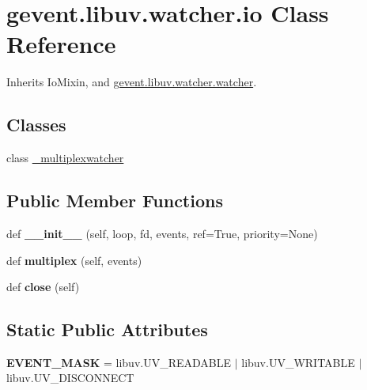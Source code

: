\hypertarget{classgevent_1_1libuv_1_1watcher_1_1io}{}\section{gevent.\+libuv.\+watcher.\+io Class Reference}
\label{classgevent_1_1libuv_1_1watcher_1_1io}


Inherits Io\+Mixin, and \hyperlink{classgevent_1_1libuv_1_1watcher_1_1watcher}{gevent.\+libuv.\+watcher.\+watcher}.

\subsection*{Classes}
\begin{DoxyCompactItemize}
\item 
class \hyperlink{classgevent_1_1libuv_1_1watcher_1_1io_1_1__multiplexwatcher}{\+\_\+multiplexwatcher}
\end{DoxyCompactItemize}
\subsection*{Public Member Functions}
\begin{DoxyCompactItemize}
\item 
\mbox{\label{classgevent_1_1libuv_1_1watcher_1_1io_a43ca516ead64a05e033499637989722b}} 
def {\bfseries \+\_\+\+\_\+init\+\_\+\+\_\+} (self, loop, fd, events, ref=True, priority=None)
\item 
\mbox{\label{classgevent_1_1libuv_1_1watcher_1_1io_a91f63864267a13ecce59bb384b0ad20b}} 
def {\bfseries multiplex} (self, events)
\item 
\mbox{\label{classgevent_1_1libuv_1_1watcher_1_1io_aa83c251d1ead4bcb50d96e63fd3a245e}} 
def {\bfseries close} (self)
\end{DoxyCompactItemize}
\subsection*{Static Public Attributes}
\begin{DoxyCompactItemize}
\item 
\mbox{\label{classgevent_1_1libuv_1_1watcher_1_1io_a0a404988710c40f68477f9e58968c979}} 
{\bfseries E\+V\+E\+N\+T\+\_\+\+M\+A\+SK} = libuv.\+U\+V\+\_\+\+R\+E\+A\+D\+A\+B\+LE $\vert$ libuv.\+U\+V\+\_\+\+W\+R\+I\+T\+A\+B\+LE $\vert$ libuv.\+U\+V\+\_\+\+D\+I\+S\+C\+O\+N\+N\+E\+CT
\end{DoxyCompactItemize}
